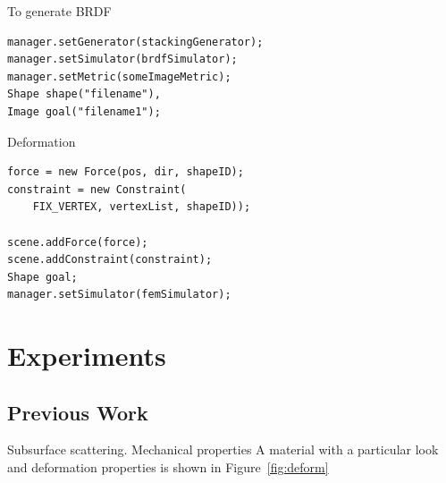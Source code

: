\documentclass[annual]{acmsiggraph}
\begin{document}
To generate BRDF
\begin{verbatim}
manager.setGenerator(stackingGenerator);
manager.setSimulator(brdfSimulator);
manager.setMetric(someImageMetric);
Shape shape("filename"), 
Image goal("filename1");
\end{verbatim}

Deformation
\begin{verbatim}
force = new Force(pos, dir, shapeID);
constraint = new Constraint(
    FIX_VERTEX, vertexList, shapeID));

scene.addForce(force);
scene.addConstraint(constraint);
Shape goal;
manager.setSimulator(femSimulator);
\end{verbatim}

\section{Experiments}
\subsection{Previous Work}
Subsurface scattering. Mechanical properties
A material with a particular
look and deformation properties is shown in Figure~\ref{fig:deform}
\end{document}
